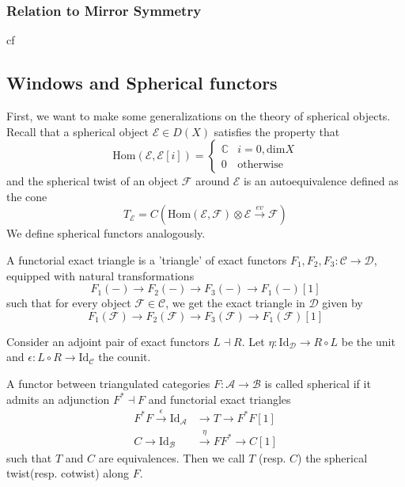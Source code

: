 \subsubsection{Relation to Mirror Symmetry}
cf


\subsection{Windows and Spherical functors}

First, we want to make some generalizations on the theory of spherical objects. Recall that a spherical object $\mathcal{E} \in D(X)$ satisfies the property that $$\mathrm{Hom}(\mathcal{E}, \mathcal{E}[i])= \begin{cases}
\mathbb{C} & i=0,\mathrm{dim}X  \\
0 & \text{otherwise}
\end{cases}$$
and the spherical twist of an object $\mathcal{F}$ around $\mathcal{E}$ is an autoequivalence defined as the cone $$T_\mathcal{E} = C(\mathrm{Hom}(\mathcal{E},\mathcal{F})\otimes \mathcal{E}\xrightarrow{ev} \mathcal{F})$$
We define spherical functors analogously.


\begin{definition}{}{}
	A functorial exact triangle is a 'triangle' of exact functors $F_{1}, F_{2}, F_{3} : \mathcal{C}\to \mathcal{D}$,    equipped with natural transformations $$
F_{1}(-)\to F_{2}(-)\to F_{3}(-)\to F_{1}(-)[1]
$$ such that for every object $\mathcal{F}\in \mathcal{C}$,   we get the exact triangle in $\mathcal{D}$ given by $$
F_{1}(\mathcal{F})\to F_{2}(\mathcal{F})\to F_{3}(\mathcal{F})\to F_{1}(\mathcal{F})[1]
$$
\end{definition}

Consider an adjoint pair of exact functors $L \dashv R$. Let $\eta : \mathrm{Id}_\mathcal{D}\to R\circ L$ be the unit and $\epsilon : L\circ R \to \mathrm{Id}_\mathcal{C}$ the counit. 

\begin{definition}{}{}
A functor between triangulated categories $F: \mathcal{A}\to \mathcal{B}$ is called spherical if it admits an adjunction $F^{*}\dashv F$ and  functorial exact triangles 
\begin{align}
F^{*}F \xrightarrow{\epsilon} \mathrm{Id}_\mathcal{A}&\to T \to F^{*}F [1] \\
C\to \mathrm{Id}_\mathcal{B}&\xrightarrow{\eta} F F^{*}\to C[1]
\end{align} such that $T$ and $C$ are equivalences. Then we call $T$ (resp. $C$) the spherical twist(resp. cotwist) along $F$. 
\end{definition}


